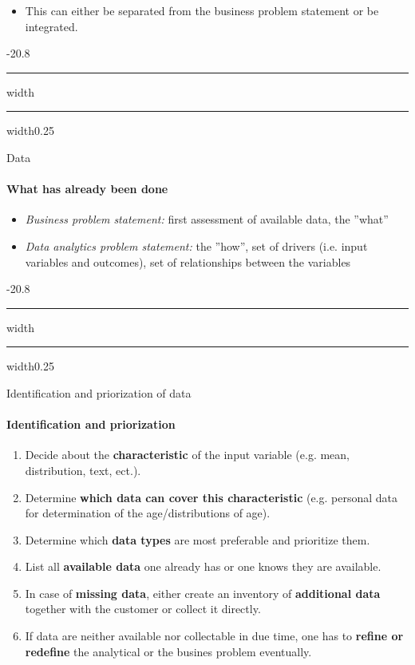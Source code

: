 \documentclass[a4paper, landscape, 6pt, fleqn]{scrartcl}
\makeatletter
\renewcommand{\emph}[1]{\textbf{#1}}
\renewcommand{\section}{\@startsection{section}{1}{0mm}%
{-2\baselineskip}{0.8\baselineskip}%
{\hrule depth 0.2pt width\columnwidth\hrule depth1.5pt
width0.25\columnwidth\vspace*{1.2em}\Large\bfseries}}
\renewcommand{\subsection}{\@startsection{subsection}{1}{0mm}%
{-2\baselineskip}{0.8\baselineskip}%
{\hrule depth 0.2pt width\columnwidth\hrule depth0.75pt
width0.25\columnwidth\vspace*{1.2em}\large\bfseries}}
\makeatother
\begin{document}
\begin{multicols*}{4}
\begin{itemize}
\item This can either be separated from the business problem statement or be integrated.
\end{itemize}

\section{Data}

\paragraph{What has already been done}

\begin{itemize}
\item \textit{Business problem statement:} first assessment of available data, the ''what''
\item \textit{Data analytics problem statement:} the ''how'', set of drivers (i.e. input variables and outcomes), set of relationships between the variables
\end{itemize}

\subsection{Identification and priorization of data}

\paragraph{Identification and priorization}

\begin{enumerate}
\item Decide about the \emph{characteristic} of the input variable (e.g. mean, distribution, text, ect.).
\item Determine \emph{which data can cover this characteristic} (e.g. personal data for determination of the age/distributions of age).
\item Determine which \emph{data types} are most preferable and prioritize them.
\item List all \emph{available data} one already has or one knows they are available.
\item In case of \emph{missing data}, either create an inventory of \emph{additional data} together with the customer or collect it directly.
\item If data are neither available nor collectable in due time, one has to \emph{refine or redefine} the analytical or the busines problem eventually.
\end{enumerate}


\end{multicols*}
\end{document}
